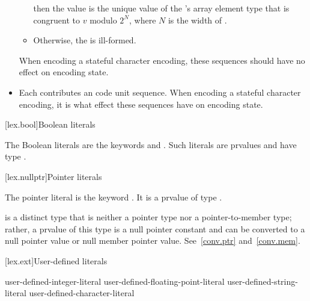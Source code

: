 \begin{itemize}
\begin{itemize}
then the value is the unique value of
the 's array element type 
that is congruent to $v$ modulo $2^N$, where $N$ is the width of .
\item
Otherwise, the  is ill-formed.
\end{itemize}
When encoding a stateful character encoding,
these sequences should have no effect on encoding state.
\item
Each 
contributes an
code unit sequence.
When encoding a stateful character encoding,
it is
what effect these sequences have on encoding state.
\end{itemize}

[lex.bool]{Boolean literals}

%
\begin{bnf}
\br
    \br
\end{bnf}

\pnum
{}%
The Boolean literals are the keywords  and .
Such literals are prvalues and have type .

[lex.nullptr]{Pointer literals}

%
\begin{bnf}
\br
\end{bnf}

\pnum
The pointer literal is the keyword . It is a prvalue of type
.
\begin{note}
 is a distinct type that is neither a pointer type nor a pointer-to-member type;
rather, a prvalue of this type is a null pointer constant and can be
converted to a null pointer value or null member pointer value. See~\ref{conv.ptr}
and~\ref{conv.mem}.
\end{note}

[lex.ext]{User-defined literals}

%
\begin{bnf}
\br
    user-defined-integer-literal\br
    user-defined-floating-point-literal\br
    user-defined-string-literal\br
    user-defined-character-literal
\end{bnf}

